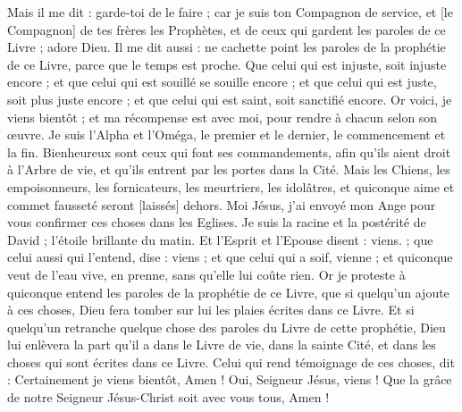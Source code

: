 \begin{multicols}{2}
Mais il me dit : garde-toi de le faire ; car je suis ton Compagnon de service, et [le Compagnon] de tes frères les Prophètes, et de ceux qui gardent les paroles de ce Livre ; adore Dieu.
Il me dit aussi : ne cachette point les paroles de la prophétie de ce Livre, parce que le temps est proche.
Que celui qui est injuste, soit injuste encore ; et que celui qui est souillé se souille encore ; et que celui qui est juste, soit plus juste encore ; et que celui qui est saint, soit sanctifié encore.
Or voici, je viens bientôt ; et ma récompense est avec moi, pour rendre à chacun selon son œuvre.
Je suis l'Alpha et l'Oméga, le premier et le dernier, le commencement et la fin.
Bienheureux sont ceux qui font ses commandements, afin qu'ils aient droit à l'Arbre de vie, et qu'ils entrent par les portes dans la Cité.
Mais les Chiens, les empoisonneurs, les fornicateurs, les meurtriers, les idolâtres, et quiconque aime et commet fausseté seront [laissés] dehors.
Moi Jésus, j'ai envoyé mon Ange pour vous confirmer ces choses dans les Eglises. Je suis la racine et la postérité de David ; l'étoile brillante du matin.
Et l'Esprit et l'Epouse disent : viens. ; que celui aussi qui l’entend, dise : viens ; et que celui qui a soif, vienne ; et quiconque veut de l'eau vive, en prenne, sans qu'elle lui coûte rien.
Or je proteste à quiconque entend les paroles de la prophétie de ce Livre, que si quelqu'un ajoute à ces choses, Dieu fera tomber sur lui les plaies écrites dans ce Livre.
Et si quelqu'un retranche quelque chose des paroles du Livre de cette prophétie, Dieu lui enlèvera la part qu'il a dans le Livre de vie, dans la sainte Cité, et dans les choses qui sont écrites dans ce Livre.
Celui qui rend témoignage de ces choses, dit : Certainement je viens bientôt, Amen ! Oui, Seigneur Jésus, viens !
Que la grâce de notre Seigneur Jésus-Christ soit avec vous tous, Amen !
\PPE{}
\end{multicols}

